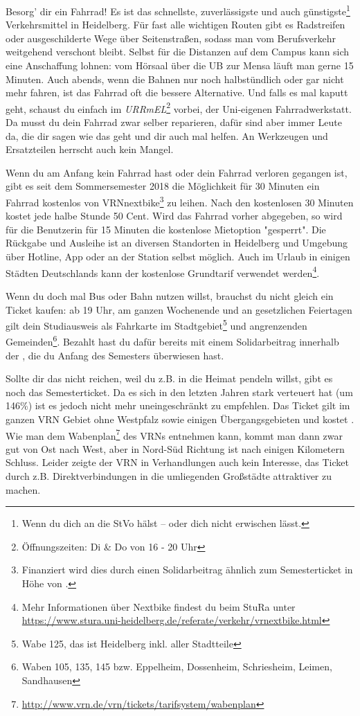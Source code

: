 Besorg' dir ein Fahrrad! Es ist das schnellste, zuverlässigste und auch günstigste\footnote{Wenn du dich an die StVo hälst -- oder dich nicht erwischen lässt.} Verkehrsmittel in Heidelberg. Für fast alle wichtigen Routen gibt es Radstreifen oder ausgeschilderte Wege über Seitenstraßen, sodass man vom Berufsverkehr weitgehend verschont bleibt. Selbst für die Distanzen auf dem Campus kann sich eine Anschaffung lohnen: vom Hörsaal über die \gls{UB} zur Mensa läuft man gerne 15 Minuten. Auch abends, wenn die Bahnen nur noch halbstündlich oder gar nicht mehr fahren, ist das Fahrrad oft die bessere Alternative. Und falls es mal kaputt geht, schaust du einfach im \emph{URRmEL}\footnote{Öffnungszeiten: Di \& Do von 16 - 20 Uhr} vorbei, der Uni-eigenen Fahrradwerkstatt. Da musst du dein Fahrrad zwar selber reparieren, dafür sind aber immer Leute da, die dir sagen wie das geht und dir auch mal helfen. An Werkzeugen und Ersatzteilen herrscht auch kein Mangel.

\label{nextbike}
Wenn du am Anfang kein Fahrrad hast oder dein Fahrrad verloren gegangen ist, gibt es seit dem Sommersemester 2018 die Möglichkeit für 30 Minuten ein Fahrrad kostenlos von VRNnextbike\footnote{Finanziert wird dies durch einen Solidarbeitrag ähnlich zum Semesterticket in Höhe von .} zu leihen. Nach den kostenlosen 30 Minuten kostet jede halbe Stunde 50 Cent. Wird das Fahrrad vorher abgegeben, so wird für die Benutzerin für 15 Minuten die kostenlose Mietoption "gesperrt". Die Rückgabe und Ausleihe ist an diversen Standorten in Heidelberg und Umgebung über Hotline, App oder an der Station selbst möglich. Auch im Urlaub in einigen Städten Deutschlands kann der kostenlose Grundtarif verwendet werden\footnote{Mehr Informationen über Nextbike findest du beim StuRa unter \url{https://www.stura.uni-heidelberg.de/referate/verkehr/vrnextbike.html}}.

Wenn du doch mal Bus oder Bahn nutzen willst, brauchst du nicht gleich ein Ticket kaufen: ab 19 Uhr, am ganzen Wochenende und an gesetzlichen Feiertagen gilt dein Studiausweis als Fahrkarte im Stadtgebiet\footnote{Wabe 125, das ist Heidelberg inkl. aller Stadtteile} und angrenzenden Gemeinden\footnote{Waben 105, 135, 145 bzw. Eppelheim, Dossenheim, Schriesheim, Leimen, Sandhausen}. Bezahlt hast du dafür bereits mit einem Solidarbeitrag innerhalb der \EUR{\beitragssumme}, die du Anfang des Semesters überwiesen hast.

Sollte dir das nicht reichen, weil du z.B. in die Heimat pendeln willst, gibt es noch das Semesterticket. Da es sich in den letzten Jahren stark verteuert hat (um 146\%) ist es jedoch nicht mehr uneingeschränkt zu empfehlen. Das Ticket gilt im ganzen VRN Gebiet ohne Westpfalz sowie einigen Übergangsgebieten und kostet \EUR{\semesterticket}. Wie man dem Wabenplan\footnote{\url{http://www.vrn.de/vrn/tickets/tarifsystem/wabenplan}} des \glspl{VRN} entnehmen kann, kommt man dann zwar gut von Ost nach West, aber in Nord-Süd Richtung ist nach einigen Kilometern Schluss. Leider zeigte der \gls{VRN} in Verhandlungen auch kein Interesse, das Ticket durch z.B. Direktverbindungen in die umliegenden Großstädte attraktiver zu machen.

